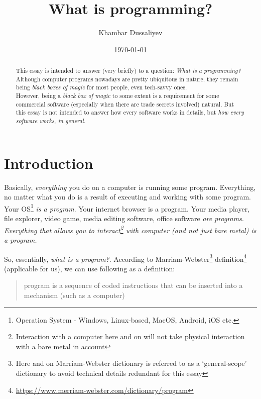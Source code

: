 \documentclass{article}
\title{What is programming?}
\author{Khambar Dussaliyev}
\date{\today}
\begin{document}
    \maketitle
    \begin{abstract}
        This essay is intended to answer (very briefly) to a question: \emph{What is a programming?}
        Although computer programs nowadays are pretty ubiquitous in nature, they remain being \emph{black boxes of magic}
        for most people, even tech-savvy ones.  
        \\
        However, being a \emph{black box of magic} to some extent is a requirement for some commercial software (especially when there are trade secrets involved) 
        natural. But this essay is not intended to answer how every software works in details, but \emph{how every software works, in general}.
    \end{abstract}
    \newpage

    \tableofcontents
    \newpage

    \section{Introduction}

        Basically, \emph{everything} you do on a computer is running some program. Everything, no matter what you do is a result of executing and working with
        some program. Your OS\footnote{Operation System - Windows, Linux-based, MacOS, Android, iOS etc.} \emph{is a program}. Your internet browser is a program. 
        Your media player, file explorer, video game, media editing software, office software \emph{are programs}. 
        \emph{Everything that allows you to interact\footnote{Interaction with a computer here and on will not take physical interaction with a bare metal in account} 
        with computer (and not just bare metal) is a program.}
        
        So, essentially, \emph{what is a program?}. According to Marriam-Webster\footnote{Here and on Marriam-Webster dictionary is referred to as a `general-scope' dictionary to avoid technical details redundant for this essay} 
        definition\footnote{\href{https://www.merriam-webster.com/dictionary/program}{https://www.merriam-webster.com/dictionary/program}} 
        (applicable for us), we can use following as a definition:
        
        \begin{quote}
            program is a sequence of coded instructions that can be inserted into a mechanism (such as a computer)
        \end{quote}
\end{document}
